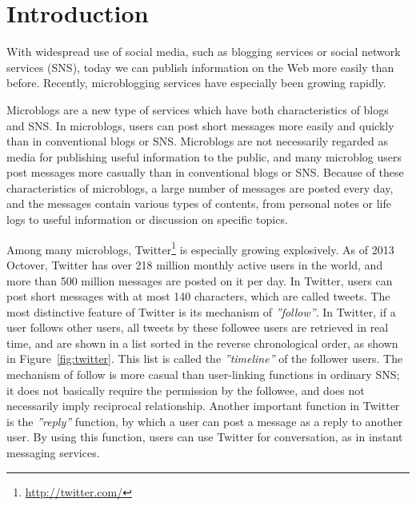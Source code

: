 \section{Introduction}
\label{sec:Introduction}

With widespread use of social media, such as blogging services or social
network services (SNS), today we can publish information
on the Web more easily than before.  Recently,
microblogging services have especially been growing rapidly.

Microblogs are a new type of services which have both characteristics
of blogs and SNS.  In microblogs, users can post short messages more
easily and quickly than in conventional blogs or SNS.
Microblogs are not necessarily regarded as media for
publishing useful information to the public, and many microblog users
post messages more casually than in conventional blogs or
SNS.  Because of these characteristics of microblogs, a
large number of messages are posted every
day, and the messages contain various types of contents, from personal
notes or life logs to useful information or discussion on specific
topics.

Among many microblogs,
Twitter\footnote{\url{http://twitter.com/}} is especially growing
explosively.  As of 2013 Octover, Twitter has over 218 million monthly
active users in the world, and more than 500 million
messages are posted on it per day\cite{TweetsData}.  In Twitter, users
can post short messages with at most 140 characters, which are called
tweets.
The most distinctive feature of Twitter is its mechanism of
\emph{''follow''}.  In Twitter, if a user follows other users, all
tweets by these followee users are retrieved in real time, and are
shown in a list sorted in the reverse chronological order, as shown in
Figure~\ref{fig:twitter}.  This list is called the \emph{''timeline''}
of the follower users.  The mechanism of follow is more casual than
user-linking functions in ordinary SNS; it does not basically require the
permission by the followee, and does not necessarily imply reciprocal
relationship. Another important function in Twitter is the
\emph{''reply''} function, by which a user can post a message as a
reply to another user.  By using this function, users can use Twitter
for conversation, as in instant messaging services.

